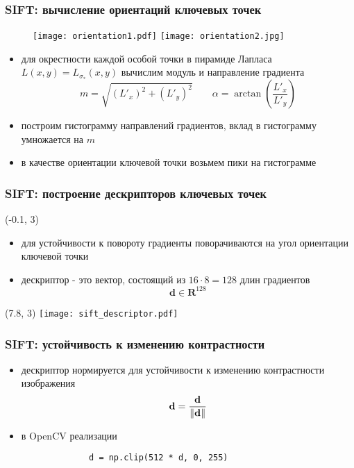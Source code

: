 \documentclass[12pt, usepdftitle=false, aspectratio=1610]{beamer}
\DeclarePairedDelimiter{\norm}{\lVert}{\rVert}
\begin{document}
\begin{frame}
\frametitle{SIFT: вычисление ориентаций ключевых точек}
\begin{figure}
    \texttt{[image: orientation1.pdf]}
    \hspace*{1cm}
    \texttt{[image: orientation2.jpg]}
\end{figure}
\begin{itemize}
    \item для окрестности каждой особой точки в пирамиде Лапласа $L(x,y)=L_{\sigma_\ast}(x,y)$
    вычислим  модуль и направление градиента
    $$
        m=\sqrt{(L'_x)^2+(L'_y)^2}\qquad
        \alpha=\arctan\left(\frac{L'_x}{L'_y}\right)
    $$
    \item построим гистограмму направлений градиентов, вклад в гистограмму умножается
    на $m$
    \item в качестве ориентации ключевой точки возьмем пики на гистограмме
\end{itemize}
\end{frame}

\begin{frame}
\frametitle{SIFT: построение дескрипторов ключевых точек}
\begin{textblock}{8}(-0.1, 3)
    \begin{itemize}
        \item для устойчивости к повороту градиенты поворачиваются на угол ориентации ключевой точки
        \item дескриптор - это вектор, состоящий из  $16\cdot8=128$  длин градиентов
        $$
            \mathbf{d}\in\mathbf{R}^{128}
        $$
    \end{itemize}
\end{textblock}
\begin{textblock}{5}(7.8, 3)
    \texttt{[image: sift\_descriptor.pdf]}
\end{textblock}
\end{frame}

\begin{frame}[fragile]
\frametitle{SIFT: устойчивость к изменению контрастности}
\begin{itemize}
\item дескриптор нормируется для устойчивости к изменению контрастности изображения 
 $$
    \mathbf{d}=\frac{\mathbf{d}}{\norm{\mathbf{d}}}
$$
\item в OpenCV реализации
\vspace*{0.4cm}

\begin{figure}[h!]
    \centering
    \begin{verbatim}
        d = np.clip(512 * d, 0, 255)
    \end{verbatim}
\end{figure}
\end{itemize}
\end{frame}
\end{document}

